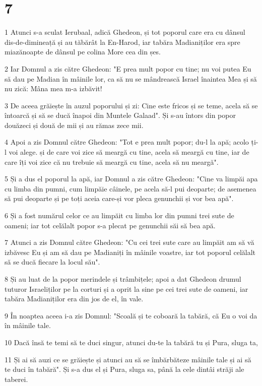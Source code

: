 \chapter{7}

\par 1 Atunci s-a sculat Ierubaal, adică Ghedeon, și tot poporul care era cu dânsul dis-de-dimineață și au tăbărât la En-Harod, iar tabăra Madianiților era spre miazănoapte de dânsul pe colina More cea din șes.
\par 2 Iar Domnul a zis către Ghedeon: "E prea mult popor cu tine; nu voi putea Eu să dau pe Madian în mâinile lor, ca să nu se mândrească Israel înaintea Mea și să nu zică: Mâna mea m-a izbăvit!
\par 3 De aceea grăiește în auzul poporului și zi: Cine este fricos și se teme, acela să se întoarcă și să se ducă înapoi din Muntele Galaad". Și s-au întors din popor douăzeci și două de mii și au rămas zece mii.
\par 4 Apoi a zis Domnul către Ghedeon: "Tot e prea mult popor; du-l la apă; acolo ți-l voi alege. și de care voi zice să meargă cu tine, acela să meargă cu tine, iar de care îți voi zice că nu trebuie să meargă cu tine, acela să nu meargă".
\par 5 Și a dus el poporul la apă, iar Domnul a zis către Ghedeon: "Cine va limpăi apa cu limba din pumni, cum limpăie câinele, pe acela să-l pui deoparte; de asemenea să pui deoparte și pe toți aceia care-și vor pleca genunchii și vor bea apă".
\par 6 Și a fost numărul celor ce au limpăit cu limba lor din pumni trei sute de oameni; iar tot celălalt popor s-a plecat pe genunchii săi să bea apă.
\par 7 Atunci a zis Domnul către Ghedeon: "Cu cei trei sute care au limpăit am să vă izbăvesc Eu și am să dau pe Madianiți în mâinile voastre, iar tot poporul celălalt să se ducă fiecare la locul său".
\par 8 Și au luat de la popor merindele și trâmbițele; apoi a dat Ghedeon drumul tuturor Israeliților pe la corturi și a oprit la sine pe cei trei sute de oameni, iar tabăra Madianiților era din jos de el, în vale.
\par 9 În noaptea aceea i-a zis Domnul: "Scoală și te coboară la tabără, că Eu o voi da în mâinile tale.
\par 10 Dacă însă te temi să te duci singur, atunci du-te la tabără tu și Pura, sluga ta,
\par 11 Și ai să auzi ce se grăiește și atunci au să se îmbărbăteze mâinile tale și ai să te duci în tabără". Și s-a dus el și Pura, sluga sa, până la cele dintâi străji ale taberei.
